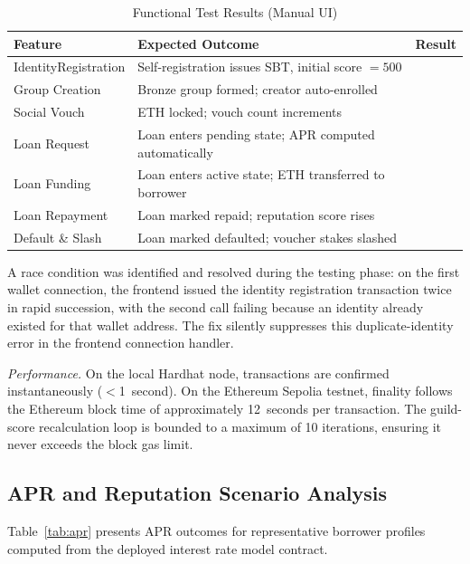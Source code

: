\documentclass[conference]{IEEEtran}
\newcommand{\cmark}{\ding{51}}  %
\begin{document}
\begin{table}[t]
\caption{Functional Test Results (Manual UI)}
\label{tab:functional}
\centering
\begin{tabular}{p{1.8cm}p{3.6cm}c}
\toprule
\textbf{Feature} & \textbf{Expected Outcome} & \textbf{Result} \\
\midrule
Identity\newline Registration
  & Self-registration issues SBT, initial score $= 500$ & \cmark \\[2pt]
Group Creation
  & Bronze group formed; creator auto-enrolled & \cmark \\[2pt]
Social Vouch
  & ETH locked; vouch count increments & \cmark \\[2pt]
Loan Request
  & Loan enters pending state; APR computed automatically & \cmark \\[2pt]
Loan Funding
  & Loan enters active state; ETH transferred to borrower & \cmark \\[2pt]
Loan Repayment
  & Loan marked repaid; reputation score rises & \cmark \\[2pt]
Default \& Slash
  & Loan marked defaulted; voucher stakes slashed & \cmark \\
\bottomrule
\end{tabular}
\end{table}

A race condition was identified and resolved during the testing phase:
on the first wallet connection, the frontend issued the identity registration
transaction twice in rapid succession, with the second call failing because an
identity already existed for that wallet address. The fix silently suppresses
this duplicate-identity error in the frontend connection handler.

\textit{Performance.} On the local Hardhat node, transactions are confirmed
instantaneously ($<$1~second). On the Ethereum Sepolia testnet, finality
follows the Ethereum block time of approximately 12~seconds per transaction.
The guild-score recalculation loop is bounded to a maximum of 10 iterations,
ensuring it never exceeds the block gas limit.

\subsection{APR and Reputation Scenario Analysis}

Table~\ref{tab:apr} presents APR outcomes for representative borrower
profiles computed from the deployed interest rate model contract.
\end{document}
